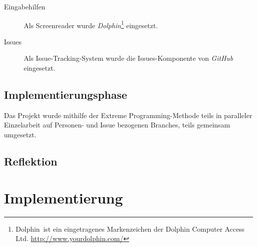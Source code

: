 \documentclass[	a4paper,		%
		titlepage, 		%
		fontsize=12pt		%
		]{scrartcl} 		%
\begin{document}
\begin{description}
 \item[Eingabehilfen]
 Als Screenreader wurde \emph{Dolphin}\footnote{Dolphin\textregistered ~ist ein eingetragenes Markenzeichen der Dolphin Computer Access Ltd. \newline \href{http://www.yourdolphin.com/}{http://www.yourdolphin.com/}} eingesetzt.

  \item[Issues]
Als Issue-Tracking-System wurde die Issues-Komponente von \emph{GitHub} eingesetzt.

 \end{description}

\subsection{Implementierungsphase}
Das Projekt wurde mithilfe der Extreme Programming-Methode teils in paralleler Einzelarbeit auf Personen- und Issue bezogenen Branches, teils gemeinsam umgesetzt.


\subsection{Reflektion}

\section{Implementierung}
\end{document}
